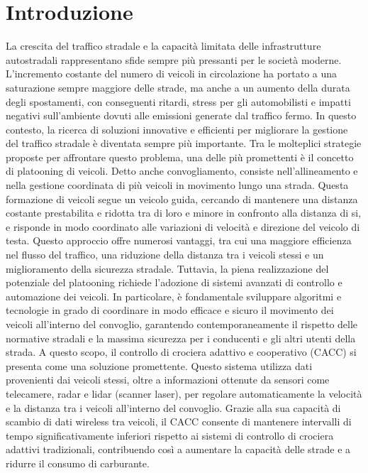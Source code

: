 \section{Introduzione}

La crescita del traffico stradale e la capacità limitata delle infrastrutture autostradali rappresentano sfide sempre più pressanti per le società moderne. L'incremento costante del numero di veicoli in circolazione ha portato a una saturazione sempre maggiore delle strade, ma anche a un aumento della durata degli spostamenti, con conseguenti ritardi, stress per gli automobilisti e impatti negativi sull'ambiente dovuti alle emissioni generate dal traffico fermo. In questo contesto, la ricerca di soluzioni innovative e efficienti per migliorare la gestione del traffico stradale è diventata sempre più importante.
\newline
Tra le molteplici strategie proposte per affrontare questo problema, una delle più promettenti è il concetto di platooning di veicoli. Detto anche convogliamento, consiste nell'allineamento e nella gestione coordinata di più veicoli in movimento lungo una strada. Questa formazione di veicoli segue un veicolo guida, cercando di mantenere una distanza costante prestabilita e ridotta tra di loro e minore in confronto alla distanza di si, e risponde in modo coordinato alle variazioni di velocità e direzione del veicolo di testa. Questo approccio offre numerosi vantaggi, tra cui una maggiore efficienza nel flusso del traffico, una riduzione della distanza tra i veicoli stessi e un miglioramento della sicurezza stradale.
\newline
Tuttavia, la piena realizzazione del potenziale del platooning richiede l'adozione di sistemi avanzati di controllo e automazione dei veicoli. In particolare, è fondamentale sviluppare algoritmi e tecnologie in grado di coordinare in modo efficace e sicuro il movimento dei veicoli all'interno del convoglio, garantendo contemporaneamente il rispetto delle normative stradali e la massima sicurezza per i conducenti e gli altri utenti della strada.
\newline
A questo scopo, il controllo di crociera adattivo e cooperativo (CACC) si presenta come una soluzione promettente. Questo sistema utilizza dati provenienti dai veicoli stessi, oltre a informazioni ottenute da sensori come telecamere, radar e lidar (scanner laser), per regolare automaticamente la velocità e la distanza tra i veicoli all'interno del convoglio. Grazie alla sua capacità di scambio di dati wireless tra veicoli, il CACC consente di mantenere intervalli di tempo significativamente inferiori rispetto ai sistemi di controllo di crociera adattivi tradizionali, contribuendo così a aumentare la capacità delle strade e a ridurre il consumo di carburante.
